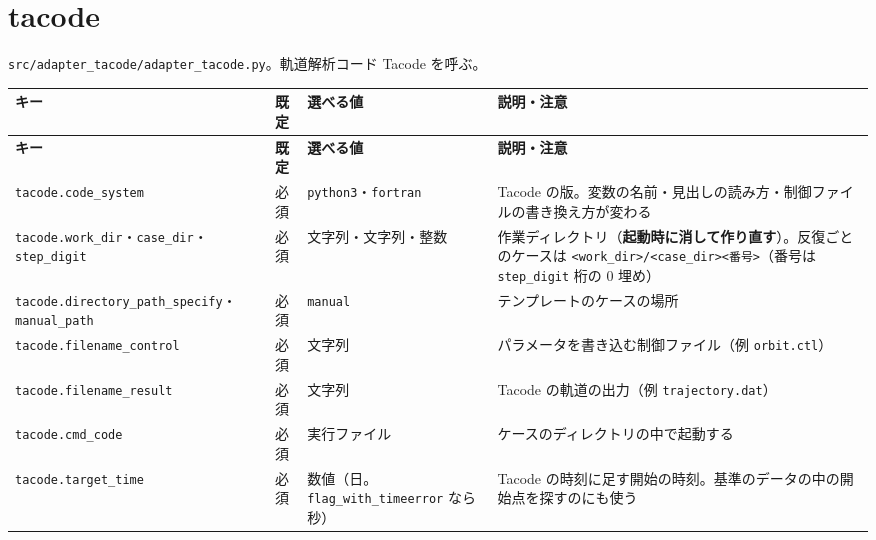 \section{tacode}

\texttt{src/\allowbreak{}adapter\_\allowbreak{}tacode/\allowbreak{}adapter\_\allowbreak{}tacode.\allowbreak{}py}。軌道解析コード Tacode を呼ぶ。

\begingroup\small
\begin{longtable}{>{\raggedright\arraybackslash}p{}>{\raggedright\arraybackslash}p{}>{\raggedright\arraybackslash}p{}>{\raggedright\arraybackslash}p{}}
\toprule
\textbf{キー} & \textbf{既定} & \textbf{選べる値} & \textbf{説明・注意} \\
\midrule
\endfirsthead
\toprule
\textbf{キー} & \textbf{既定} & \textbf{選べる値} & \textbf{説明・注意} \\
\midrule
\endhead
\bottomrule
\endlastfoot
\texttt{tacode.\allowbreak{}code\_\allowbreak{}system} & 必須 & \texttt{python3}・\texttt{fortran} & Tacode の版。変数の名前・見出しの読み方・制御ファイルの書き換え方が変わる \\
\texttt{tacode.\allowbreak{}work\_\allowbreak{}dir}・\texttt{case\_\allowbreak{}dir}・\texttt{step\_\allowbreak{}digit} & 必須 & 文字列・文字列・整数 & 作業ディレクトリ（\textbf{起動時に消して作り直す}）。反復ごとのケースは \texttt{<work\_\allowbreak{}dir>/\allowbreak{}<case\_\allowbreak{}dir><番号>}（番号は \texttt{step\_\allowbreak{}digit} 桁の 0 埋め） \\
\texttt{tacode.\allowbreak{}directory\_\allowbreak{}path\_\allowbreak{}specify}・\texttt{manual\_\allowbreak{}path} & 必須 & \texttt{manual} & テンプレートのケースの場所 \\
\texttt{tacode.\allowbreak{}filename\_\allowbreak{}control} & 必須 & 文字列 & パラメータを書き込む制御ファイル（例 \texttt{orbit.\allowbreak{}ctl}） \\
\texttt{tacode.\allowbreak{}filename\_\allowbreak{}result} & 必須 & 文字列 & Tacode の軌道の出力（例 \texttt{trajectory.\allowbreak{}dat}） \\
\texttt{tacode.\allowbreak{}cmd\_\allowbreak{}code} & 必須 & 実行ファイル & ケースのディレクトリの中で起動する \\
\texttt{tacode.\allowbreak{}target\_\allowbreak{}time} & 必須 & 数値（日。\texttt{flag\_\allowbreak{}with\_\allowbreak{}timeerror} なら秒） & Tacode の時刻に足す開始の時刻。基準のデータの中の開始点を探すのにも使う \\

\end{longtable}
